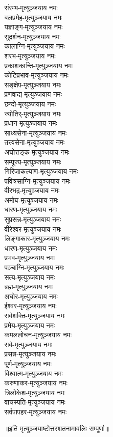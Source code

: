 \begin{multicols}{2}
\begin{flushleft}
संरम्भ-मृत्युञ्जयाय नमः\\
बलप्रमेह-मृत्युञ्जयाय नमः\\
यज्ञाङ्ग-मृत्युञ्जयाय नमः\\
सुदर्शन-मृत्युञ्जयाय नमः\\
कालाग्नि-मृत्युञ्जयाय नमः\hfill{}\\
शरभ-मृत्युञ्जयाय नमः\\
प्रकाशकान्ति-मृत्युञ्जयाय नमः\\
कोटिप्रभाव-मृत्युञ्जयाय नमः\\
सङ्क्षेप-मृत्युञ्जयाय नमः\\
प्रणवाद्य-मृत्युञ्जयाय नमः\\
छन्दो-मृत्युञ्जयाय नमः\\
ज्योतिर्-मृत्युञ्जयाय नमः\\
प्रधान-मृत्युञ्जयाय नमः\\
साध्यसेना-मृत्युञ्जयाय नमः\\
तत्त्वसेना-मृत्युञ्जयाय नमः\hfill{}\\
अघोत्तङ्क-मृत्युञ्जयाय नमः\\
सम्पूज्य-मृत्युञ्जयाय नमः\\
गिरिजाकल्याण-मृत्युञ्जयाय नमः\\
पवित्रसाग्नि-मृत्युञ्जयाय नमः\\
वीरभद्र-मृत्युञ्जयाय नमः\\
अमोघ-मृत्युञ्जयाय नमः\\
धारण-मृत्युञ्जयाय नमः\\
सुप्रसन्न-मृत्युञ्जयाय नमः\\
वीरेश्वर-मृत्युञ्जयाय नमः\\
लिङ्गाकार-मृत्युञ्जयाय नमः\hfill{}\\
धारण-मृत्युञ्जयाय नमः\\
प्रभव-मृत्युञ्जयाय नमः\\
पञ्चाग्नि-मृत्युञ्जयाय नमः\\
सत्य-मृत्युञ्जयाय नमः\\
ब्रह्म-मृत्युञ्जयाय नमः\\
अघोर-मृत्युञ्जयाय नमः\\
ईश्वर-मृत्युञ्जयाय नमः\\
सर्वशक्ति-मृत्युञ्जयाय नमः\\
प्रमेय-मृत्युञ्जयाय नमः\\
कमललोचन-मृत्युञ्जयाय नमः\hfill{}\\
सर्व-मृत्युञ्जयाय नमः\\
प्रसन्न-मृत्युञ्जयाय नमः\\
पूर्ण-मृत्युञ्जयाय नमः\\
विश्वात्म-मृत्युञ्जयाय नमः\\
करुणाकर-मृत्युञ्जयाय नमः\\
त्रिलोकेश-मृत्युञ्जयाय नमः\\
वाचस्पति-मृत्युञ्जयाय नमः\\
सर्वपापहर-मृत्युञ्जयाय नमः\\
\end{flushleft}
\end{multicols}
॥इति मृत्युञ्जयाष्टोत्तरशतनामावलिः सम्पूर्णा॥
